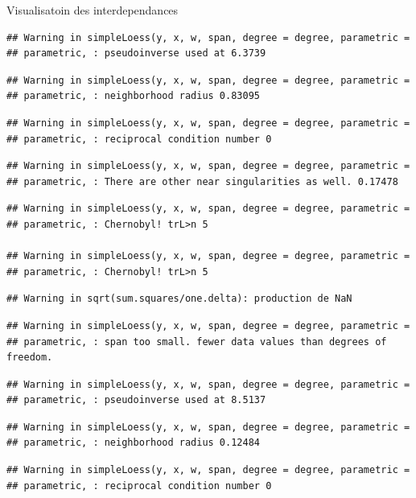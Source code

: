 \documentclass[11pt,ignorenonframetext,]{beamer}
\begin{document}
\begin{frame}[fragile]{Visualisatoin des interdependances}
\begin{verbatim}
## Warning in simpleLoess(y, x, w, span, degree = degree, parametric =
## parametric, : pseudoinverse used at 6.3739
\end{verbatim}

\begin{verbatim}
## Warning in simpleLoess(y, x, w, span, degree = degree, parametric =
## parametric, : neighborhood radius 0.83095
\end{verbatim}

\begin{verbatim}
## Warning in simpleLoess(y, x, w, span, degree = degree, parametric =
## parametric, : reciprocal condition number 0
\end{verbatim}

\begin{verbatim}
## Warning in simpleLoess(y, x, w, span, degree = degree, parametric =
## parametric, : There are other near singularities as well. 0.17478
\end{verbatim}

\begin{verbatim}
## Warning in simpleLoess(y, x, w, span, degree = degree, parametric =
## parametric, : Chernobyl! trL>n 5

## Warning in simpleLoess(y, x, w, span, degree = degree, parametric =
## parametric, : Chernobyl! trL>n 5
\end{verbatim}

\begin{verbatim}
## Warning in sqrt(sum.squares/one.delta): production de NaN
\end{verbatim}

\begin{verbatim}
## Warning in simpleLoess(y, x, w, span, degree = degree, parametric =
## parametric, : span too small. fewer data values than degrees of freedom.
\end{verbatim}

\begin{verbatim}
## Warning in simpleLoess(y, x, w, span, degree = degree, parametric =
## parametric, : pseudoinverse used at 8.5137
\end{verbatim}

\begin{verbatim}
## Warning in simpleLoess(y, x, w, span, degree = degree, parametric =
## parametric, : neighborhood radius 0.12484
\end{verbatim}

\begin{verbatim}
## Warning in simpleLoess(y, x, w, span, degree = degree, parametric =
## parametric, : reciprocal condition number 0
\end{verbatim}


\end{frame}
\end{document}
